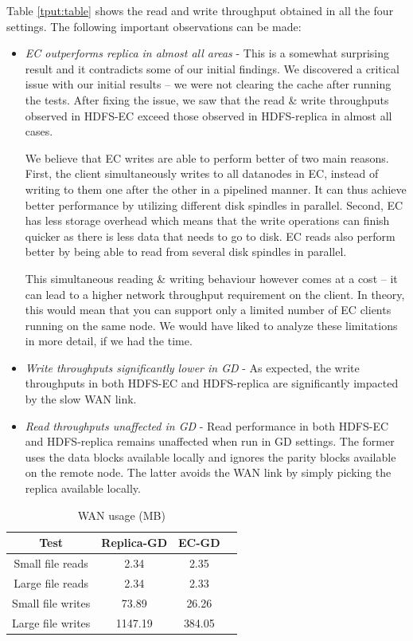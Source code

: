 \documentclass{sig-alternate-05-2015}
\begin{document}
Table \ref{tput:table} shows the read and write throughput obtained in all the four settings. The following important observations can be made:
\begin{itemize}
\item \emph{EC outperforms replica in almost all areas} - This is a somewhat surprising result and it contradicts some of our initial findings. We discovered a critical issue with our initial results -- we were not clearing the cache after running the tests. After fixing the issue, we saw that the read \& write throughputs observed in HDFS-EC exceed those observed in HDFS-replica in almost all cases. 

We believe that EC writes are able to perform better of two main reasons. First, the client simultaneously writes to all datanodes in EC, instead of writing to them one after the other in a pipelined manner. It can thus achieve better performance by utilizing different disk spindles in parallel. Second, EC has less storage overhead which means that the write operations can finish quicker as there is less data that needs to go to disk. EC reads also perform better by being able to read from several disk spindles in parallel. 

This simultaneous reading \& writing behaviour however comes at a cost -- it can lead to a higher network throughput requirement on the client. In theory, this would mean that you can support only a limited number of EC clients running on the same node. We would have liked to analyze these limitations in more detail, if we had the time. 

\item \emph{Write throughputs significantly lower in GD} - As expected, the write throughputs in both HDFS-EC and HDFS-replica are significantly impacted by the slow WAN link. 

\item \emph{Read throughputs unaffected in GD} - Read performance in both HDFS-EC and HDFS-replica remains unaffected when run in GD settings. The former uses the data blocks available locally and ignores the parity blocks available on the remote node. The latter avoids the WAN link by simply picking the replica available locally.  
\end{itemize}

\begin{table}
\centering

\begin{tabular}{|c|c|c|l|} \hline
Test&Replica-GD&EC-GD\\ \hline
Small file reads&2.34&2.35\\ \hline
Large file reads&2.34&2.33\\ \hline
Small file writes&73.89&26.26\\ \hline
Large file writes&1147.19&384.05 \\

\hline\end{tabular}
\caption{WAN usage (MB)}
\label{wan:table}
\end{table}
\end{document}
